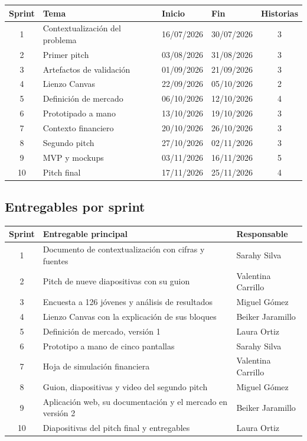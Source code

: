 \documentclass[11pt,a4paper]{article}
\begin{document}
\begin{tabularx}{\textwidth}{c X l l c}
  \toprule
  \textbf{Sprint} & \textbf{Tema} & \textbf{Inicio} & \textbf{Fin} & \textbf{Historias} \\
  \midrule
  1 & Contextualización del problema & 16/07/2026 & 30/07/2026 & 3 \\
  2 & Primer pitch & 03/08/2026 & 31/08/2026 & 3 \\
  3 & Artefactos de validación & 01/09/2026 & 21/09/2026 & 3 \\
  4 & Lienzo Canvas & 22/09/2026 & 05/10/2026 & 2 \\
  5 & Definición de mercado & 06/10/2026 & 12/10/2026 & 4 \\
  6 & Prototipado a mano & 13/10/2026 & 19/10/2026 & 3 \\
  7 & Contexto financiero & 20/10/2026 & 26/10/2026 & 3 \\
  8 & Segundo pitch & 27/10/2026 & 02/11/2026 & 3 \\
  9 & MVP y mockups & 03/11/2026 & 16/11/2026 & 5 \\
  10 & Pitch final & 17/11/2026 & 25/11/2026 & 4 \\
  \bottomrule
\end{tabularx}

\subsection{Entregables por sprint}

\begin{tabularx}{\textwidth}{c X l}
  \toprule
  \textbf{Sprint} & \textbf{Entregable principal} & \textbf{Responsable} \\
  \midrule
  1 & Documento de contextualización con cifras y fuentes & Sarahy Silva \\
  2 & Pitch de nueve diapositivas con su guion & Valentina Carrillo \\
  3 & Encuesta a 126 jóvenes y análisis de resultados & Miguel Gómez \\
  4 & Lienzo Canvas con la explicación de sus bloques & Beiker Jaramillo \\
  5 & Definición de mercado, versión 1 & Laura Ortiz \\
  6 & Prototipo a mano de cinco pantallas & Sarahy Silva \\
  7 & Hoja de simulación financiera & Valentina Carrillo \\
  8 & Guion, diapositivas y video del segundo pitch & Miguel Gómez \\
  9 & Aplicación web, su documentación y el mercado en versión 2 & Beiker Jaramillo \\
  10 & Diapositivas del pitch final y entregables & Laura Ortiz \\
  \bottomrule
\end{tabularx}
\end{document}
